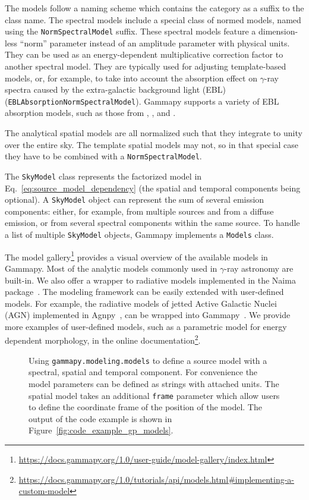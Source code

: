 \documentclass[longauth]{aa}
\newcommand{\code}[1]{\texttt{#1}}
\newcommand{\gammapy}{Gammapy\xspace}
\newcommand{\agnpy}{Agnpy\xspace}
\newcommand{\gammaray}{$\gamma$-ray\xspace}
\begin{document}
The models follow a naming scheme which contains the category as a suffix to
the class name. The spectral models include a special class of normed models,
named using the \code{NormSpectralModel} suffix.
These spectral models feature a dimension-less \enquote{norm} parameter
instead of an amplitude parameter with physical units. They
can be used as an energy-dependent multiplicative correction
factor to another spectral model. They are typically used for
adjusting template-based models, or, for example, to take into account
the absorption effect on \gammaray spectra caused by the extra-galactic background
light (EBL) (\code{EBLAbsorptionNormSpectralModel}). \gammapy supports a variety
of EBL absorption models, such as those from \cite{Franceschini2008, Franceschini2017}, \cite{Finke2010},
and \cite{Dominguez2011}.

The analytical spatial models are all normalized such that they integrate to
unity over the entire sky. The template spatial models may not, so in that special
case they have to be combined with a \code{NormSpectralModel}.

The \code{SkyModel} class represents the factorized model in Eq.~\ref{eq:source_model_dependency}
(the spatial and temporal components being optional).
A \code{SkyModel} object can represent the sum of several emission components:
either, for example, from multiple sources and from a diffuse emission, or from several spectral
components within the same source. To handle a list of multiple \code{SkyModel} objects, \gammapy
implements a \code{Models} class.

The model gallery\footnote{\url{https://docs.gammapy.org/1.0/user-guide/model-gallery/index.html}}
 provides a visual overview of the available models in
\gammapy. Most of the analytic models commonly used in \gammaray astronomy are
built-in. We also offer a wrapper to radiative models implemented in the Naima
package~\citep{naima}. The modeling framework can be easily extended with
user-defined models. For example, the radiative models of jetted Active Galactic Nuclei (AGN)
implemented in \agnpy~\citep{agnpy2022}, can be wrapped into 
\gammapy~\citep[see Section 3.5 of ][]{2022A&A...660A..18N}. We provide 
more examples of user-defined models, such as a parametric model for energy dependent morphology,
in the online documentation\footnote{\url{https://docs.gammapy.org/1.0/tutorials/api/models.html\#implementing-a-custom-model}}.


\begin{figure}
        \small
        \caption{Using \code{gammapy.modeling.models} to define a source model with a
    spectral, spatial and temporal component. For convenience the model
    parameters can be defined as strings with attached units. The spatial model
    takes an additional \code{frame} parameter which allow users to define
    the coordinate frame of the position of the model. The output
        of the code example is shown in Figure~\ref{fig:code_example_gp_models}.
    }
        \label{fig*:minted:gp_models}
\end{figure}
\end{document}
